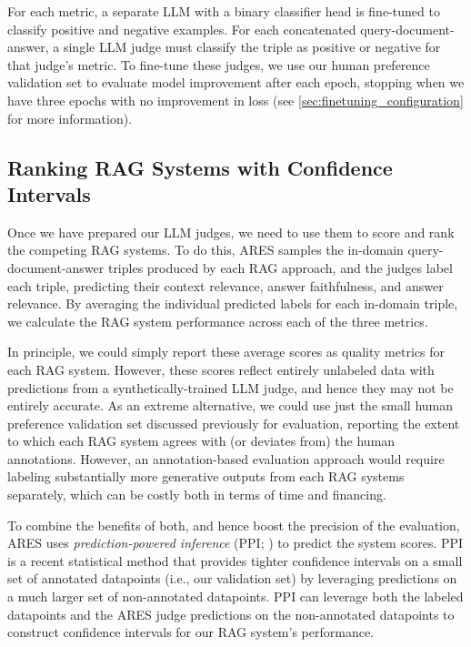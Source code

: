 For each metric, a separate LLM with a binary classifier head is fine-tuned to classify positive and negative examples. 
For each concatenated query-document-answer, a single LLM judge must classify the triple as positive or negative for that judge's metric.
To fine-tune these judges, we use our human preference validation set to evaluate model improvement after each epoch, stopping when we have three epochs with no improvement in loss (see \autoref{sec:finetuning_configuration} for more information).



\subsection{Ranking RAG Systems with Confidence Intervals}
\label{sec:ranking_rag_with_ppi}

Once we have prepared our LLM judges, we need to use them to score and rank the competing RAG systems. 
To do this, ARES samples the in-domain query-document-answer triples produced by each RAG approach, and the judges label each triple, predicting their context relevance, answer faithfulness, and answer relevance.
By averaging the individual predicted labels for each in-domain triple, we calculate the RAG system performance across each of the three metrics.

In principle, we could simply report these average scores as quality metrics for each RAG system. However, these scores reflect entirely unlabeled data with predictions from a synthetically-trained LLM judge, and hence they may not be entirely accurate.
As an extreme alternative, we could use just the small human preference validation set discussed previously for evaluation, reporting the extent to which each RAG system agrees with (or deviates from) the human annotations.
However, an annotation-based evaluation approach would require labeling substantially more generative outputs from each RAG systems separately, which can be costly both in terms of time and financing.

To combine the benefits of both, and hence boost the precision of the evaluation, ARES uses \textit{prediction-powered inference} (PPI; \citealt{angelopoulos2023predictionpowered}) to predict the system scores. PPI is a recent statistical method that provides tighter confidence intervals on a small set of annotated datapoints (i.e., our validation set) by leveraging predictions on a much larger set of non-annotated datapoints.
PPI can leverage both the labeled datapoints and the ARES judge predictions on the non-annotated datapoints to construct confidence intervals for our RAG system's performance. %

